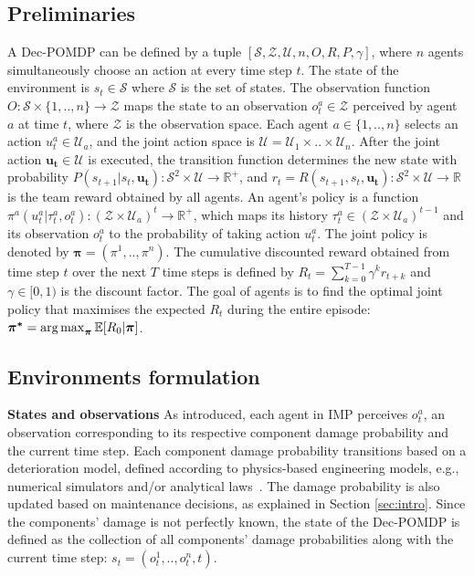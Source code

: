 \subsection{Preliminaries}
\label{sec:decpomdp}
A Dec-POMDP \citep{DecPomdp} can be defined by a tuple $[\mathcal{S}, \mathcal{Z}, \mathcal{U}, n, O, R, P, \gamma]$, where $n$ agents simultaneously choose an action at every time step $t$.
The state of the environment is $s_t \in \mathcal{S}$ where $\mathcal{S}$ is the set of states.
The observation function $O: \mathcal{S} \times \{1,..,n\} \rightarrow \mathcal{Z}$ maps the state to an observation $o_t^{a} \in \mathcal{Z}$ perceived by agent $a$ at time $t$, where $\mathcal{Z}$ is the observation space.
Each agent $a \in \{1,..,n\}$ selects an action $u_t^{a} \in \mathcal{U}_a$, and the joint action space is $\mathcal{U}=\mathcal{U}_{1}\times..\times\mathcal{U}_{n}$.
After the joint action $\boldsymbol{u_t} \in \mathcal{U}$ is executed, the transition function determines the new state with probability $P(s_{t+1}|s_t, \boldsymbol{u_t}): \mathcal{S}^2 \times \mathcal{U} \rightarrow \mathbb{R^+}$, and $r_t=R(s_{t+1}, s_t, \boldsymbol {u_t}): \mathcal{S}^2 \times \mathcal{U} \rightarrow \mathbb{R}$ is the team reward obtained by all agents.
An agent's policy is a function $\pi^{a}(u_t^{a}|\tau_t^{a},o_t^{a}): (\mathcal{Z} \times \mathcal{U}_a)^t \rightarrow \mathbb{R^+}$, which maps its history $\tau_t^{a} \in (\mathcal{Z} \times \mathcal{U}_a)^{t-1}$ and its observation $o_t^{a}$ to the probability of taking action $u_t^{a}$. 
The joint policy is denoted by $\boldsymbol{\pi}=(\pi^1,..,\pi^n)$.
The cumulative discounted reward obtained from time step $t$ over the next $T$ time steps is defined by $R_{t} = \sum_{k=0}^{T-1} \gamma^k r_{t+k}$ and $\gamma \in [0, 1)$ is the discount factor.
The goal of agents is to find the optimal joint policy that maximises the expected $R_t$ during the entire episode: $\boldsymbol{\pi^{*}} =\operatorname*{arg\,max}_{\boldsymbol{\pi}} \mathbb{E}[R_0|\boldsymbol{\pi}]$.

\subsection{Environments formulation}
\label{sec:env_formulation}
\textbf{States and observations}
As introduced, each agent in IMP perceives $o^a_t$, an observation corresponding to its respective component damage probability and the current time step.
Each component damage probability transitions based on a deterioration model, defined according to physics-based engineering models, e.g., numerical simulators and/or analytical laws~\citep{Papakonstantinou2014Part1}.
The damage probability is also updated based on maintenance decisions, as explained in Section \ref{sec:intro}.
Since the components' damage is not perfectly known, the state of the Dec-POMDP is defined as the collection of all components' damage probabilities along with the current time step: $s_t = (o_t^1, .., o_t^n, t)$.

